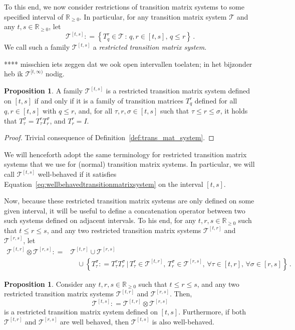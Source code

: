 \documentclass[10pt]{paper}
\theoremstyle{definition}
\newtheorem{proposition}[theorem]{Proposition}
\newcommand{\reals}{\mathbb{R}}
\newcommand{\realsnonneg}{\reals_{\geq 0}}
\newcommand{\coloneqq}{:\!=}
\begin{document}
To this end, we now consider restrictions of transition matrix systems to some specified interval of $\realsnonneg$. In particular, for any transition matrix system $\mathcal{T}$ and any $t,s\in\realsnonneg$, let
\begin{equation*}
\mathcal{T}^{[t,s]} \coloneqq \left\{T_q^r\in\mathcal{T}\,:\,q,r\in[t,s],\, q\leq r\right\}\,.
\end{equation*}
We call such a family $\mathcal{T}^{[t,s]}$ a \emph{restricted transition matrix system}.

**** misschien iets zeggen dat we ook open intervallen toelaten; in het bijzonder heb ik $\mathcal{T}^{[t,\infty)}$ nodig.

\begin{proposition}\label{prop:restr_trans_mat_system_if_semigroup}
A family $\mathcal{T}^{[t,s]}$ is a restricted transition matrix system defined on $[t,s]$ if and only if it is a family of transition matrices $T_q^r$ defined for all $q,r\in[t,s]$ with $q\leq r$, and, for all $\tau,r,\sigma\in[t,s]$ such that $\tau\leq r\leq \sigma$, it holds that $T_\tau^\sigma = T_\tau^rT_r^\sigma$, and $T_r^r=I$.
\end{proposition}
\begin{proof}
Trivial consequence of Definition~\ref{def:trans_mat_system}.
\end{proof}
We will henceforth adopt the same terminology for restricted transition matrix systems that we use for (normal) transition matrix systems. In particular, we will call $\mathcal{T}^{[t,s]}$ well-behaved if it satisfies Equation~\eqref{eq:wellbehavedtransitionmatrixsystem} on the interval $[t,s]$.

Now, because these restricted transition matrix systems are only defined on some given interval, it will be useful to define a concatenation operator between two such systems defined on adjacent intervals. To his end, for any $t,r,s\in\realsnonneg$ such that $t\leq r\leq s$, and any two restricted transition matrix systems $\mathcal{T}^{[t,r]}$ and $\mathcal{T}^{[r,s]}$, let
\begin{align*}
\mathcal{T}^{[t,r]} \otimes \mathcal{T}^{[r,s]} \coloneqq &\mathcal{T}^{[t,r]} \cup \mathcal{T}^{[r,s]} \\
 &\quad \cup \left\{T_\tau^\sigma\coloneqq T_\tau^rT_r^{\sigma}\,\Big\vert\,T_{\tau}^r\in\mathcal{T}^{[t,r]},\,T_r^{\sigma}\in\mathcal{T}^{[r,s]},\,\forall\tau\in[t,r],\,\forall\sigma\in[r,s]\right\}\,.
\end{align*}
\begin{proposition}\label{prop:concat_restr_trans_mat_systems_is_system}
Consider any $t,r,s\in\realsnonneg$ such that $t\leq r\leq s$, and any two restricted transition matrix systems $\mathcal{T}^{[t,r]}$ and $\mathcal{T}^{[r,s]}$. Then,
\begin{equation*}
\mathcal{T}^{[t,s]} \coloneqq \mathcal{T}^{[t,r]}\otimes \mathcal{T}^{[r,s]}
\end{equation*}
is a restricted transition matrix system defined on $[t,s]$. Furthermore, if both $\mathcal{T}^{[t,r]}$ and $\mathcal{T}^{[r,s]}$ are well behaved, then $\mathcal{T}^{[t,s]}$ is also well-behaved.
\end{proposition}
\end{document}
